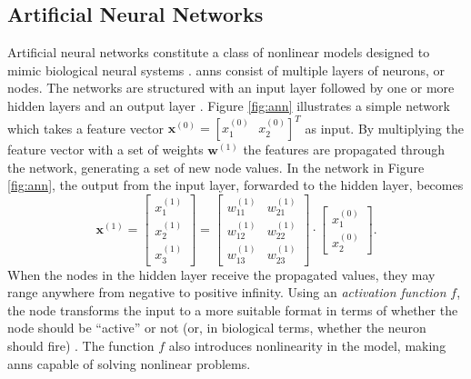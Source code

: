 

\subsection{Artificial Neural Networks}
Artificial neural networks constitute a class of nonlinear models designed to mimic biological neural systems \citep{rojas_1996}. \gls{ann}s consist of multiple layers of neurons, or nodes. The networks are structured with an input layer followed by one or more hidden layers and an output layer \citep{logan_2017}. Figure \ref{fig:ann} illustrates a simple network which takes a feature vector $\mathbf{x}^{(0)}=[x_1^{(0)}\text{ }  x_2^{(0)}]^{T}$ as input. By multiplying the feature vector with a set of weights $\mathbf{w}^{(1)}$ the features are propagated through the network, generating a set of new node values. In the network in Figure \ref{fig:ann}, the output from the input layer, forwarded to the hidden layer, becomes
\begin{equation}\label{eq:nn}
	\mathbf{x}^{(1)}=\begin{bmatrix}x_1^{(1)} \\ x_2^{(1)} \\ x_3^{(1)} \end{bmatrix} = 
	\begin{bmatrix} w_{11}^{(1)} & w_{21}^{(1)} \\ w_{12}^{(1)} & w_{22}^{(1)} \\ w_{13}^{(1)} & w_{23}^{(1)}\end{bmatrix}\cdot \begin{bmatrix}x_1^{(0)} \\ x_2^{(0)}\end{bmatrix}.
\end{equation}
When the nodes in the hidden layer receive the propagated values, they may range anywhere from negative to positive infinity. Using an \textit{activation function} $f$, the node transforms the input to a more suitable format in terms of whether the node should be ``active'' or not (or, in biological terms, whether the neuron should fire) \citep{kriesel_2007}. The function $f$ also introduces nonlinearity in the model, making \gls{ann}s capable of solving nonlinear problems. 

